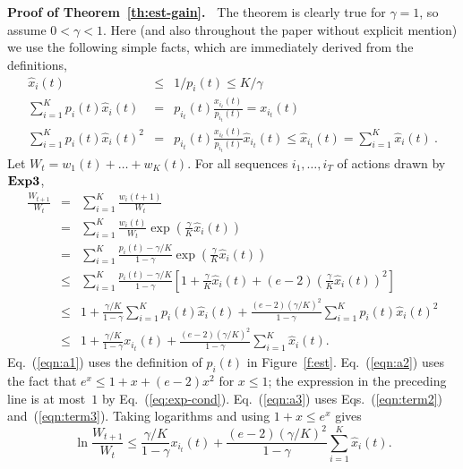 \documentclass[12pt]{article}
\newcommand{\Aest}{{\bf Exp3}}
\newcommand{\expb}[1]{\exp\left(#1\right)}
\newcommand{\x}[2]{x_{#1}({#2})}
\newcommand{\w}[2]{w_{#1}({#2})}
\renewcommand{\i}[1]{i_{#1}}
\newcommand{\xit}{\x{\i{t}}{t}}
\newcommand{\p}[2]{p_{#1}(#2)}
\newcommand{\hx}[2]{\hat{x}_{#1}(#2)}
\newcommand{\hxit}{\hx{\i{t}}{t}}
\newcommand{\pit}{\p{\i{t}}{t}}
\begin{document}
\medskip\noindent
{\bf Proof of Theorem~\ref{th:est-gain}.\ }
The theorem is clearly true for $\gamma = 1$, so assume $0 < \gamma < 1$.
Here (and also throughout the paper without explicit mention) we use the following
simple facts, which are immediately derived from the definitions,
\begin{eqnarray}
\label{eq:exp-cond}
        \hx{i}{t} & \leq & 1/\p{i}{t} \leq K/\gamma
\\
\label{eqn:term2}
        \sum_{i=1}^K \p{i}{t} \hx{i}{t}
        &=& \pit \frac{\xit}{\pit} = \xit
\\
\label{eqn:term3}
\label{eqn:hxit}
        \sum_{i=1}^K \p{i}{t} \hx{i}{t}^2
        &=& \pit \frac{\xit}{\pit} \hxit \leq \hxit = \sum_{i=1}^K \hx{i}{t}~.
\end{eqnarray}
Let $W_t = \w{1}{t}+\ldots+\w{K}{t}$.
For all sequences $i_1,\ldots,i_T$ of actions drawn by $\Aest$,
\begin{eqnarray}
        \frac{W_{t+1}}{W_{t}} 
& = &
        \sum_{i=1}^K \frac{\w{i}{t+1}}{W_t}
\nonumber
\\ & = &
        \sum_{i=1}^K \frac{\w{i}{t}}{W_t} \expb{\frac{\gamma}{K}\hx{i}{t}}
\nonumber
\\ & = &
        \sum_{i=1}^K \frac{\p{i}{t}-\gamma/K}{1-\gamma} \expb{\frac{\gamma}{K}\hx{i}{t}}
\label{eqn:a1}
\\ & \leq &
        \sum_{i=1}^K \frac{\p{i}{t}-\gamma/K}{1-\gamma}
    \left[1 + \frac{\gamma}{K}\hx{i}{t}
        + (e-2)\left(\frac{\gamma}{K}\hx{i}{t}\right)^2 \right]
\label{eqn:a2}
\\ & \leq &
        1 + \frac{\gamma/K}{1-\gamma} \sum_{i=1}^K \p{i}{t} \hx{i}{t}
    + \frac{(e-2)(\gamma/K)^2}{1-\gamma}\sum_{i=1}^K \p{i}{t} \hx{i}{t}^2
\\ & \leq &
        1 + \frac{\gamma/K}{1-\gamma} \xit
    + \frac{(e-2)(\gamma/K)^2}{1-\gamma}\sum_{i=1}^K \hx{i}{t}.
\label{eqn:a3}
\end{eqnarray}
Eq.~(\ref{eqn:a1}) uses the definition of $\p{i}{t}$ in
Figure~\ref{f:est}.
Eq.~(\ref{eqn:a2}) uses the fact that $e^x \leq 1+x+(e-2)x^2$ for
$x\leq 1$; the expression in the preceding line is at most~$1$ by
Eq.~(\ref{eq:exp-cond}).
Eq.~(\ref{eqn:a3}) uses Eqs.~(\ref{eqn:term2}) and~(\ref{eqn:term3}).
Taking logarithms and using $1+x\leq e^x$ gives
\[
  \ln\frac{W_{t+1}}{W_t} \leq \frac{\gamma/K}{1-\gamma} \xit
            + \frac{(e-2)(\gamma/K)^2}{1-\gamma}\sum_{i=1}^K \hx{i}{t}.
\]
\end{document}
